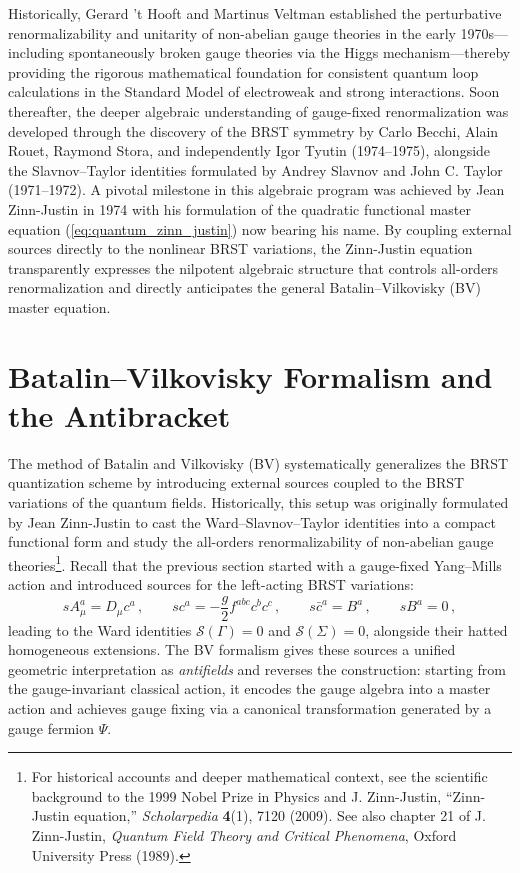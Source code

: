 Historically, Gerard 't Hooft and Martinus Veltman established the perturbative renormalizability and unitarity of non-abelian gauge theories in the early 1970s—including spontaneously broken gauge theories via the Higgs mechanism—thereby providing the rigorous mathematical foundation for consistent quantum loop calculations in the Standard Model of electroweak and strong interactions. Soon thereafter, the deeper algebraic understanding of gauge-fixed renormalization was developed through the discovery of the BRST symmetry by Carlo Becchi, Alain Rouet, Raymond Stora, and independently Igor Tyutin (1974--1975), alongside the Slavnov--Taylor identities formulated by Andrey Slavnov and John C. Taylor (1971--1972). A pivotal milestone in this algebraic program was achieved by Jean Zinn-Justin in 1974 with his formulation of the quadratic functional master equation (\ref{eq:quantum_zinn_justin}) now bearing his name. By coupling external sources directly to the nonlinear BRST variations, the Zinn-Justin equation transparently expresses the nilpotent algebraic structure that controls all-orders renormalization and directly anticipates the general Batalin--Vilkovisky (BV) master equation.

\section{Batalin--Vilkovisky Formalism and the Antibracket}

The method of Batalin and Vilkovisky (BV) systematically generalizes the BRST quantization scheme by introducing external sources coupled to the BRST variations of the quantum fields. Historically, this setup was originally formulated by Jean Zinn-Justin to cast the Ward--Slavnov--Taylor identities into a compact functional form and study the all-orders renormalizability of non-abelian gauge theories\footnote{For historical accounts and deeper mathematical context, see the scientific background to the 1999 Nobel Prize in Physics and J. Zinn-Justin, ``Zinn-Justin equation,'' \textit{Scholarpedia} \textbf{4}(1), 7120 (2009). See also chapter 21 of J. Zinn-Justin, \textit{Quantum Field Theory and Critical Phenomena}, Oxford University Press (1989).}. Recall that the previous section started with a gauge-fixed Yang--Mills action and introduced sources for the left-acting BRST variations:
\begin{equation} \label{eq:bv_sec1_brst_rules}
    sA_\mu^a = D_\mu c^a \, , \qquad sc^a = -\frac{g}{2} f^{abc} c^b c^c \, , \qquad s\bar{c}^a = B^a \, , \qquad sB^a = 0 \, ,
\end{equation}
leading to the Ward identities \(\mathcal{S}(\Gamma) = 0\) and \(\mathcal{S}(\Sigma) = 0\), alongside their hatted homogeneous extensions. The BV formalism gives these sources a unified geometric interpretation as \textit{antifields} and reverses the construction: starting from the gauge-invariant classical action, it encodes the gauge algebra into a master action and achieves gauge fixing via a canonical transformation generated by a gauge fermion \(\Psi\).

